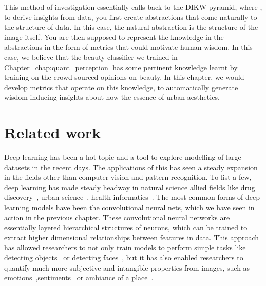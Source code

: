 This method of investigation essentially calls back to the DIKW pyramid, where , to derive insights from data, you first create abstractions that come naturally to the structure of data. In this case, the natural abstraction is the structure of the image itself. You are then supposed to represent the knowledge in the abstractions in the form of metrics that could motivate human wisdom. In this case, we believe that the beauty classifier we trained in Chapter~\ref{chap:quant_perception} has some pertinent knowledge learnt by training on the crowd sourced opinions on beauty. In this chapter, we would develop metrics that operate on this knowledge, to automatically generate wisdom inducing insights about how the essence of urban aesthetics.


\section{Related work}
Deep learning has been a hot topic and a tool to explore modelling of large datasets in the recent days. The applications of this has seen a steady expansion in the fields other than computer vision and pattern recognition. To list a few, deep learning has made steady headway in natural science allied fields like drug discovery~\cite{gawehn2016deep}, urban science~\cite{pang2017deepcity,cordts2016cityscapes,li2017deep}, health informatics~\cite{ravi2016deep}. The most common forms of deep learning models have been the convolutional neural nets, which we have seen in action in the previous chapter. These convolutional neural networks are essentially layered hierarchical structures of neurons, which can be trained to extract higher dimensional relationships between features in data. This approach has allowed researchers to not only train models to perform simple tasks like detecting objects~\cite{krizhevsky2012imagenet} or detecting faces~\cite{ranjan2017hyperface}, but it has also enabled researchers to quantify much more subjective and intangible properties from images, such as emotions~\cite{kim2013deep},sentiments~\cite{SentiBank} or ambiance of a place~\cite{redi2015like}.

